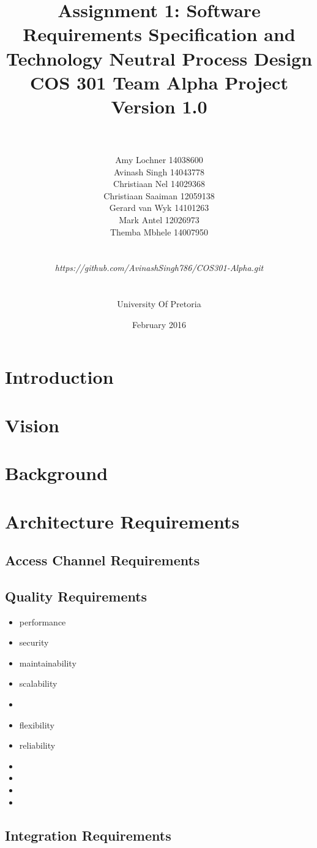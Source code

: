 \documentclass[a4paper]{article}
\title{\huge Assignment 1: Software Requirements Specification and Technology Neutral Process Design
\\COS 301 Team Alpha Project
\\Version 1.0}
\author{\\\\Amy Lochner 14038600\\ Avinash Singh 14043778 \\
Christiaan Nel 14029368\\ Christiaan Saaiman 12059138 \\
Gerard van Wyk 14101263\\ Mark Antel 12026973\\
Themba Mbhele 14007950
\\
\\
\\\textit{https://github.com/AvinashSingh786/COS301-Alpha.git}
\\
\\
\\ University Of Pretoria\\}
\date{February 2016}
\begin{document}
\maketitle
\newpage


\tableofcontents
\newpage

\section{Introduction}


\section{Vision}

\section{Background}
\section{Architecture Requirements}
\subsection{Access Channel Requirements}
\subsection{Quality Requirements}
\begin{itemize}
	\item performance
	\item security
	\item maintainability
	\item scalability
	\item 
	\item flexibility
	\item reliability
	\item 
	\item 
	\item 
	\item 
\end{itemize}

\subsection{Integration Requirements}
\end{document}
